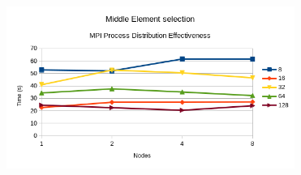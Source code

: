 \documentclass[11pt]{article}
\begin{document}
\begin{enumerate}
\begin{center}
\end{center}
\begin{center}
\includegraphics[height=200]{./charts/cuda-12-runfile/process-distribution-effectiveness.png}
\end{center}

\printbibliography[heading=bibnumbered]
\end{enumerate}
\end{document}
